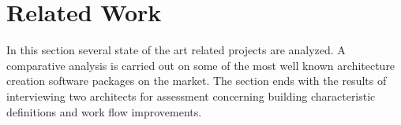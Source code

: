 \chapter{Related Work}


In this section several state of the art related projects are analyzed. 
A comparative analysis is carried out on some of the most well known architecture creation software packages on the market.
The section ends with the results of interviewing two architects for assessment concerning building characteristic definitions and
work flow improvements.






